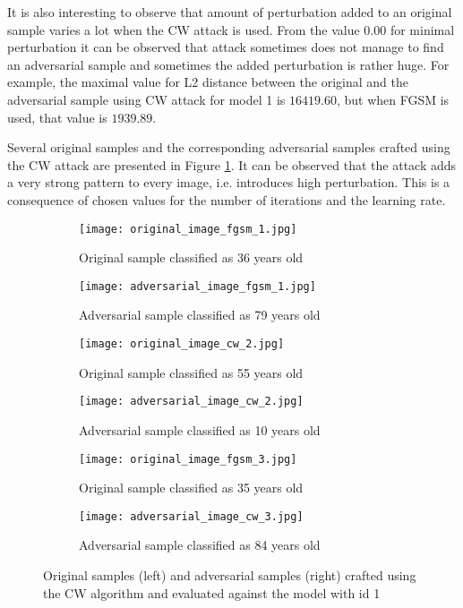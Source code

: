 It is also interesting to observe that amount of perturbation added to an original sample varies a lot when the CW attack is used. From the value $0.00$ for minimal perturbation it can be observed that attack sometimes does not manage to find an adversarial sample and sometimes the added perturbation is rather huge. For example, the maximal value for L2 distance between the original and the adversarial sample using CW attack for model 1 is $16419.60$, but when FGSM is used, that value is $1939.89$.

Several original samples and the corresponding adversarial samples crafted using the CW attack are presented in Figure \ref{fig:cw-attack}. It can be observed that the attack adds a very strong pattern to every image, i.e. introduces high perturbation. This is a consequence of chosen values for the number of iterations and the learning rate. 

\begin{figure}

\begin{subfigure}{.5\textwidth}
  \centering
  \texttt{[image: original\_image\_fgsm\_1.jpg]}
  \caption{Original sample classified as 36 years old}
\end{subfigure}
\begin{subfigure}{.5\textwidth}
  \centering
  \texttt{[image: adversarial\_image\_fgsm\_1.jpg]}
  \caption{Adversarial sample classified as 79 years old}
\end{subfigure}

\begin{subfigure}{.5\textwidth}
  \centering
  \texttt{[image: original\_image\_cw\_2.jpg]}
  \caption{Original sample classified as 55 years old}
\end{subfigure}
\begin{subfigure}{.5\textwidth}
  \centering
  \texttt{[image: adversarial\_image\_cw\_2.jpg]}
  \caption{Adversarial sample classified as 10 years old}
\end{subfigure}

\begin{subfigure}{.5\textwidth}
  \centering
  \texttt{[image: original\_image\_fgsm\_3.jpg]}
  \caption{Original sample classified as 35 years old}
\end{subfigure}
\begin{subfigure}{.5\textwidth}
  \centering
  \texttt{[image: adversarial\_image\_cw\_3.jpg]}
  \caption{Adversarial sample classified as 84 years old}
\end{subfigure}

\caption{Original samples (left) and adversarial samples (right) crafted using the CW algorithm and evaluated against the model with id 1}
\label{fig:cw-attack}
\end{figure}


